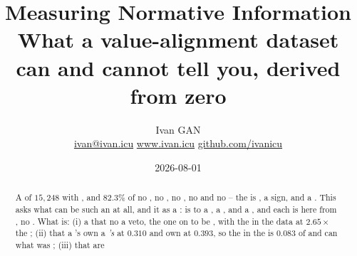 

\title{\sffamily\bfseries Measuring Normative Information\\[0.35em]
  {\large\mdseries What a value-alignment dataset can and cannot tell you, derived from zero}}
\author{\sffamily Ivan GAN\\[3pt]
\small\mdseries
\href{mailto:ivan@ivan.icu}{ivan@ivan.icu}
\quad
\href{https://www.ivan.icu}{www.ivan.icu}
\quad
\href{https://github.com/ivanicu}{github.com/ivanicu}}
\date{2026-08-01}


\maketitle

\begin{abstract}
\noindent
A   of     $15{,}248$   with
 , and $82.3\%$ of    no , no
, no , no  and no  -- the  
 is , a sign, and a . This  asks what can be 
 such an  at all, and  it as a  :  
is   to a   , a   , and a
 , and each is  here from ,  no .
What  is: (i) a  that no    a veto,  the
  one  on     to be
, with the   in the data at $2.65\times$ the 
; (ii) that a 's own    a \emph{'s}
 at $0.310$ and  own at $0.393$, so the   in the
 is $0.083$ of  and   can  what was 
; (iii) that   are   

\end{abstract}
